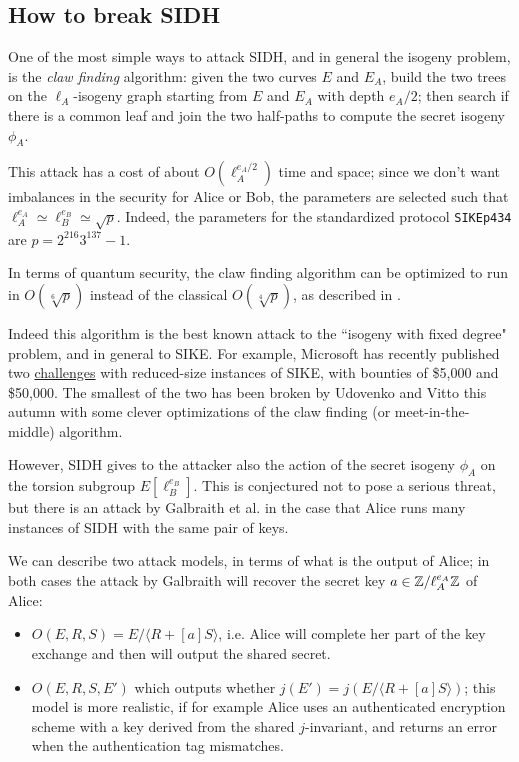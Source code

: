 \subsection{How to break SIDH}
One of the most simple ways to attack SIDH, and in general the isogeny problem, is the \emph{claw finding} algorithm: given the two curves $E$ and $E_A$, build the two trees on the $\ell_A$-isogeny graph starting from $E$ and $E_A$ with depth $e_A/2$; then search if there is a common leaf and join the two half-paths to compute the secret isogeny $\phi_A$.

This attack has a cost of about $O(\ell_A^{e_A/2})$ time and space; since we don't want imbalances in the security for Alice or Bob, the parameters are selected such that $\ell_A^{e_A}\simeq \ell_B^{e_B}\simeq \sqrt{p}$. Indeed, the parameters for the standardized protocol \texttt{SIKEp434} are $p=2^{216}3^{137}-1$.

In terms of quantum security, the claw finding algorithm can be optimized to run in $O(\sqrt[6]{p})$ instead of the classical $O(\sqrt[4]{p})$, as described in \cite{Tani_claw}.

Indeed this algorithm is the best known attack to the ``isogeny with fixed degree" problem, and in general to SIKE. For example, Microsoft has recently published two \href{https://www.microsoft.com/en-us/msrc/sike-cryptographic-challenge}{challenges} with reduced-size instances of SIKE, with bounties of \$5,000 and \$50,000. The smallest of the two has been broken by Udovenko and Vitto \cite{SIKE_challenge} this autumn with some clever optimizations of the claw finding (or meet-in-the-middle) algorithm.


However, SIDH gives to the attacker also the action of the secret isogeny $\phi_A$ on the torsion subgroup $E[\ell_B^{e_B}]$. This is conjectured not to pose a serious threat, but there is an attack by Galbraith et al. \cite{SIKE_Galbraith} in the case that Alice runs many instances of SIDH with the same pair of keys.

We can describe two attack models, in terms of what is the output of Alice; in both cases the attack by Galbraith will recover the secret key $a\in\mathbb{Z}/\ell_A^{e_A}\mathbb{Z}$ of Alice:
\begin{itemize}
    \item $O(E,R,S)=E/\langle R+[a]S\rangle$, i.e. Alice will complete her part of the key exchange and then will output the shared secret.
    \item $O(E,R,S,E')$ which outputs whether $j(E')=j(E/\langle R+[a]S\rangle)$; this model is more realistic, if for example Alice uses an authenticated encryption scheme with a key derived from the shared $j$-invariant, and returns an error when the authentication tag mismatches.
\end{itemize}

